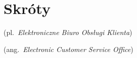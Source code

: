 % 
\chapter*{Skróty}
\label{sec:skroty}
\noindent\vspace{-\topsep-\partopsep-\parsep} %
\begin{description}[labelwidth=*]
  \item [eBOK] (pl.\ \emph{Elektroniczne Biuro Obsługi Klienta})
  \item [eCSO] (ang.\ \emph{Electronic Customer Service Office})
\end{description}
